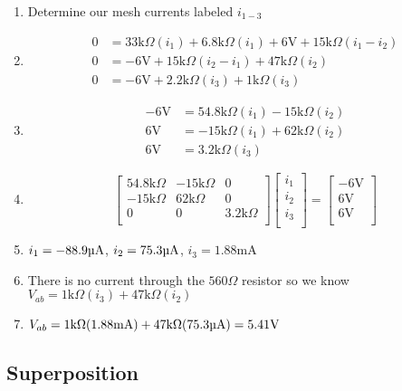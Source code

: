 \documentclass[12pt]{article}
\def\k{\mathrm{k}}
\def\V{\mathrm{V}}
\def\A{\mathrm{A}}
\def\m{\mathrm{m}}
\def\u{\textrm{\textmu}}
\begin{document}
\begin{enumerate}
	\item Determine our mesh currents labeled $i_{1-3}$
	\item \begin{align*}
		      0 & =33\k\Omega(i_1)+6.8\k\Omega(i_1)+6\V+15\k\Omega(i_1-i_2) \\
		      0 & =-6\V+15\k\Omega(i_2-i_1)+47\k\Omega(i_2)                 \\
		      0 & =-6\V+2.2\k\Omega(i_3)+1\k\Omega(i_3)
	      \end{align*}
	\item \begin{align*}
		      -6\V & = 54.8\k\Omega(i_1)-15\k\Omega(i_2) \\
		      6\V  & = -15\k\Omega(i_1)+62\k\Omega(i_2)  \\
		      6\V  & = 3.2\k\Omega(i_3)
	      \end{align*}
	\item \[
		      \begin{bmatrix}
			      54.8\k\Omega & -15\k\Omega & 0           \\
			      -15\k\Omega  & 62\k\Omega  & 0           \\
			      0            & 0           & 3.2\k\Omega \\
		      \end{bmatrix}
		      \begin{bmatrix}
			      i_1 \\
			      i_2 \\
			      i_3 \\
		      \end{bmatrix}
		      =
		      \begin{bmatrix}
			      -6\V \\
			      6\V  \\
			      6\V  \\
		      \end{bmatrix}
	      \]
	\item $i_1=-88.9\u\A$, $i_2=75.3\u\A$, $i_3=1.88\m\A$
	\item There is no current through the $560\Omega$ resistor so we know $V_{ab}=1\k\Omega(i_3)+47\k\Omega(i_2)$
	\item $V_{ab}=1\k\Omega(1.88\m\A)+47\k\Omega(75.3\u\A)=5.41\V$
\end{enumerate}

\clearpage

\subsection{Superposition}
\end{document}
